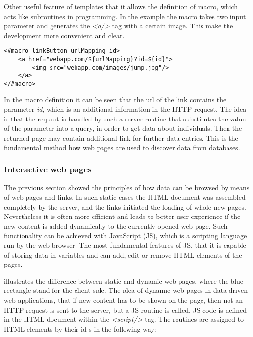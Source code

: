 Other useful feature of templates that it allows the definition of macro, which acts like subroutines in programming. In the example the macro \textit{\@linkButton} takes two input parameter and generates the \textit{<a/>} tag with a certain image. This make the development more convenient and clear.

\begin{lstlisting}[captionpos=b, caption=Macro definition, label=skullJSON, belowskip=1em, aboveskip=2em,
basicstyle=\footnotesize,frame=single]
<#macro linkButton urlMapping id>
	<a href="webapp.com/${urlMapping}?id=${id}">
		<img src="webapp.com/images/jump.jpg"/>
	</a>
</#macro>
\end{lstlisting}

In the macro definition it can be seen that the url of the link contains the parameter \textit{id}, which is an additional information in the HTTP request. The idea is that the request is handled by such a server routine that substitutes the value of the parameter into a query, in order to get data about individuals. Then the returned page may contain additional link for further data entries. This is the fundamental method how web pages are used to discover data from databases.

\subsubsection{Interactive web pages}

The previous section showed the principles of how data can be browsed by means of web pages and links. In such static cases the HTML document was assembled completely by the server, and the links initiated the loading of whole new pages. Nevertheless it is often more efficient and leads to better user experience if the new content is added dynamically to the currently opened web page. Such functionality can be achieved with JavaScript (JS), which is a scripting language run by the web browser. The most fundamental features of JS, that it is capable of storing data in variables and can add, edit or remove HTML elements of the pages. 


 illustrates the difference between static and dynamic web pages, where the blue rectangle stand for the client side. The idea of dynamic web pages in data driven web applications, that if new content has to be shown on the page, then not an HTTP request is sent to the server, but a JS routine is called. JS code is defined in the HTML document within the \textit{<script/>} tag. The routines are assigned to HTML elements by their id-s in the following way:

